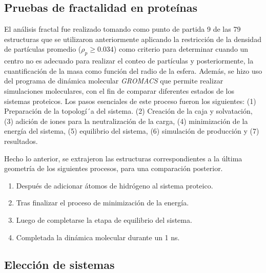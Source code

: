  	
	\subsection{Pruebas de fractalidad en proteínas}
	\label{sec:pfp}
 	
 	
 	El an\'{a}lisis fractal fue realizado tomando como punto de partida 9 de las 79 estructuras que se utilizaron anteriormente aplicando la restricci\'{o}n de la densidad de part\'{i}culas  promedio ($\rho_{p} \geq 0.034$) como criterio para determinar cuando un centro no es adecuado para realizar el conteo de part\'{i}culas y posteriormente, la cuantificaci\'{o}n de la masa como funci\'{o}n del radio de la esfera. Adem\'{a}s, se hizo uso del programa de din\'{a}mica molecular \textit{GROMACS}\cite{Lemkul2024, Abraham2015} que permite realizar simulaciones moleculares, con el fin de comparar diferentes estados de los sistemas proteicos. Los pasos esenciales de este proceso fueron los siguientes: (1) Preparaci\'{o}n de la topolog\'{i´}a del sistema. (2) Creaci\'{o}n de la caja y solvataci\'{o}n, (3) adici\'{o}n de iones para la neutralizaci\'{o}n de la carga, (4) minimizaci\'{o}n de la energ\'{i}a del sistema, (5) equilibrio del sistema, (6) simulaci\'{o}n de producci\'{o}n y (7) resultados.
 	
 	
 	
 	Hecho lo anterior, se extrajeron las estructuras correspondientes a la última 
 	geometría de los siguientes procesos, para una comparación posterior.
 	
 	\begin{enumerate}
 		\item Despu\'{e}s de adicionar \'{a}tomos de hidr\'{o}geno al sistema proteico. 
 		\item Tras finalizar el proceso de minimizaci\'{o}n de la energ\'{i}a.
 		\item Luego de completarse la etapa de equilibrio del sistema.
 		\item Completada la din\'{a}mica molecular durante un 1 ns.
 	\end{enumerate}
 	
 	
 	\subsection{Elecci\'{o}n de sistemas}
 	
